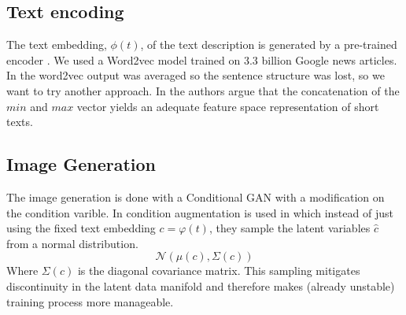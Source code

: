 \documentclass[../main.tex]{subfiles}
\begin{document}
\subsection{Text encoding}
The text embedding, $\phi(t)$, of the text description is generated by a pre-trained encoder \cite{reed2016learning}. We used a Word2vec \cite{mikolov2013word2vec} model trained on 3.3 billion Google news articles. In \cite{reed2016learning} the word2vec output was averaged so the sentence structure was lost, so we want to try another approach. In \cite{de2016representation} the authors argue that the concatenation of the $min$ and $max$ vector yields an adequate feature space representation of short texts.
\subsection{Image Generation}
The image generation is done with a Conditional GAN \cite{mirza2014conditionalgan} with a modification on the condition varible. In \cite{zhang2017stackgan} condition augmentation is used in which instead of just using the fixed text embedding $c = \varphi(t)$, they sample the latent variables $\hat{c}$ from a normal distribution. 
\begin{equation}
    \mathcal{N}(\mu (c),\Sigma (c))
\end{equation}
Where $\Sigma (c)$ is the diagonal covariance matrix. This sampling mitigates discontinuity in the latent data manifold and therefore makes (already unstable) training process more manageable. 
\end{document}
